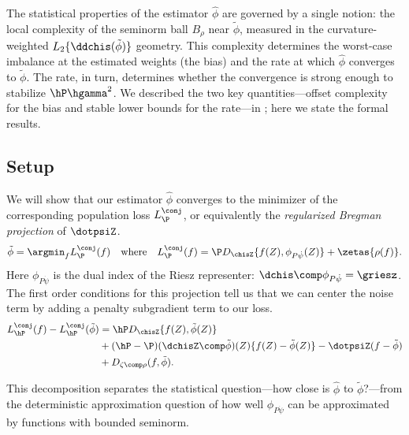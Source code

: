 \documentclass{article}
\begin{document}
The statistical properties of the estimator $\hat\phi$
are governed by a single notion:
the local complexity of the seminorm ball $B_\rho$
near $\tilde\phi$,
measured in the curvature-weighted $L_2\{\ddchis(\tilde\phi)\}$ geometry.
This complexity determines
the worst-case imbalance
at the estimated weights (the bias)
and the rate at which $\hat\phi$ converges to $\tilde\phi$.
The rate, in turn,
determines whether the convergence is strong enough
to stabilize $\hP \hgamma^2$.
We described the two key quantities---offset complexity for the bias
and stable lower bounds for the rate---in
;
here we state the formal results.

\subsection{Setup}
\label{sec:setup}

We will show that our estimator $\hat\phi$ converges to the minimizer of the corresponding population loss $L^\conj_{\P}$, or equivalently the \emph{regularized Bregman projection} of $\dotpsiZ$.
\begin{equation}
\label{eq:regularized-bregman-projection}
\tilde\phi
= \argmin_{f} L^\conj_{\P}(f) \quad \text{where} \quad L^\conj_{\P}(f) = \P D_{\chisZ}\{f(Z), \phi_{P\dot\psi}(Z)\} + \zetas\{\rho(f)\}.
\end{equation}
Here $\phi_{P\dot\psi}$ is the dual index of the Riesz representer: $\dchis \comp \phi_{P\dot\psi} = \griesz$.
The first order conditions for this projection tell us that we can center the noise term by adding a penalty subgradient term to our loss.
\begin{equation}
\begin{aligned}
\label{eq:loss-difference-with-foc}
L^\conj_{\hP}(f) - L^\conj_{\hP}(\tilde\phi)
&= \hP D_{\chisZ}\{f(Z), \tilde\phi(Z)\} \\
&+ (\hP-\P) (\dchisZ \comp \tilde\phi)(Z)\{f(Z) - \tilde\phi(Z)\} - \dotpsiZ(f - \tilde\phi) \\
&+ D_{\zeta \comp \rho}(f, \tilde \phi).
\end{aligned}
\end{equation}

This decomposition separates the statistical question---how close is $\hat\phi$ to $\tilde\phi$?---from the deterministic approximation question of how well $\phi_{P\dot\psi}$ can be approximated by functions with bounded seminorm.
\end{document}
